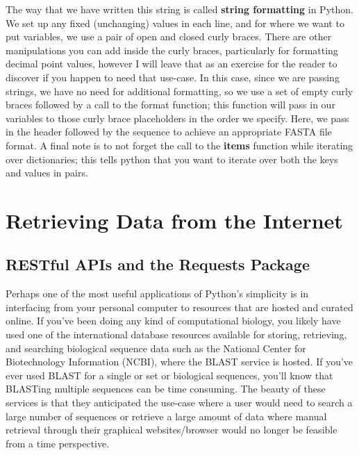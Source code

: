 \documentclass[a4paper,11pt]{article}
\begin{document}
The way that we have written this string is called \textbf{string formatting} in Python.  We 
set up any fixed (unchanging) values in each line, and for where we want to put variables, we 
use a pair of open and closed curly braces.  There are other manipulations you can add inside 
the curly braces, particularly for formatting decimal point values, however I will leave that 
as an exercise for the reader to discover if you happen to need that use-case.  In this case, 
since we are passing strings, we have no need for additional formatting, so we use a set of 
empty curly braces followed by a call to the format function; this function will pass in our 
variables to those curly brace placeholders in the order we specify.  Here, we pass in the header
followed by the sequence to achieve an appropriate FASTA file format.  A final note is to not 
forget the call to the \textbf{items} function while iterating over dictionaries; this tells 
python that you want to iterate over both the keys and values in pairs.

\pagebreak
\section{Retrieving Data from the Internet}
\subsection{RESTful APIs and the Requests Package}
Perhaps one of the most useful applications of Python's simplicity is in interfacing from 
your personal computer to resources that are hosted and curated online.  If you've been 
doing any kind of computational biology, you likely have used one of the international 
database resources available for storing, retrieving, and searching biological sequence 
data such as the National Center for Biotechnology Information (NCBI), where the BLAST 
service is hosted.  If you've ever used BLAST for a single or set or biological sequences, 
you'll know that BLASTing multiple sequences can be time consuming.  The beauty of these 
services is that they anticipated the use-case where a user would need to search a 
large number of sequences or retrieve a large amount of data where manual retrieval 
through their graphical websites/browser would no longer be feasible from a time 
perspective.  \par
\end{document}

